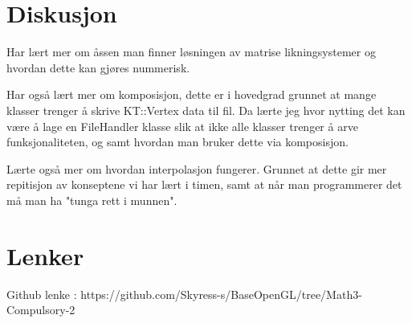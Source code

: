 ﻿\documentclass[14]{article}
\begin{document}
\begin{flushleft}
        \section{Diskusjon}
        Har lært mer om åssen man finner løsningen av matrise likningsystemer og hvordan dette kan gjøres nummerisk.
        
        
        Har også lært mer om komposisjon, dette er i hovedgrad grunnet at mange klasser trenger å skrive KT::Vertex
        data til fil. Da lærte jeg hvor nytting det kan være å lage en FileHandler klasse slik at ikke alle klasser trenger 
        å arve funksjonaliteten, og samt hvordan man bruker dette via komposisjon.
        
        Lærte også mer om hvordan interpolasjon fungerer. Grunnet at dette gir mer repitisjon av konseptene vi har lært i timen,
        samt at når man programmerer det må man ha "tunga rett i munnen".
       
        \section{Lenker}
        Github lenke : https://github.com/Skyress-s/BaseOpenGL/tree/Math3-Compulsory-2
    \end{flushleft}
\end{document}
